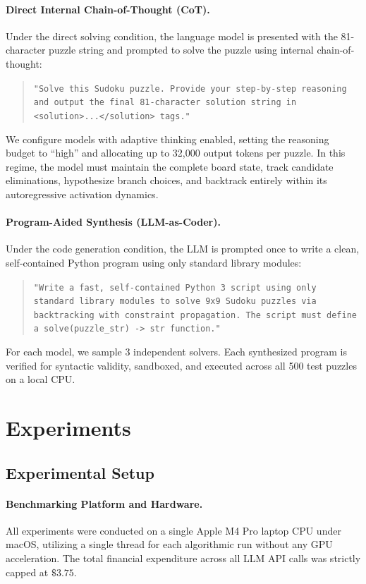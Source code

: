 \documentclass{article} %
\begin{document}
\paragraph{Direct Internal Chain-of-Thought (CoT).}
Under the direct solving condition, the language model is presented with the 81-character puzzle string and prompted to solve the puzzle using internal chain-of-thought:
\begin{quote}
\small
\texttt{"Solve this Sudoku puzzle. Provide your step-by-step reasoning and output the final 81-character solution string in <solution>...</solution> tags."}
\end{quote}
We configure models with adaptive thinking enabled, setting the reasoning budget to ``high'' and allocating up to 32,000 output tokens per puzzle. In this regime, the model must maintain the complete board state, track candidate eliminations, hypothesize branch choices, and backtrack entirely within its autoregressive activation dynamics.

\paragraph{Program-Aided Synthesis (LLM-as-Coder).}
Under the code generation condition, the LLM is prompted once to write a clean, self-contained Python program using only standard library modules:
\begin{quote}
\small
\texttt{"Write a fast, self-contained Python 3 script using only standard library modules to solve 9x9 Sudoku puzzles via backtracking with constraint propagation. The script must define a solve(puzzle\_str) -> str function."}
\end{quote}
For each model, we sample 3 independent solvers. Each synthesized program is verified for syntactic validity, sandboxed, and executed across all 500 test puzzles on a local CPU.

\section{Experiments}
\label{sec:experiments}

\subsection{Experimental Setup}
\paragraph{Benchmarking Platform and Hardware.} All experiments were conducted on a single Apple M4 Pro laptop CPU under macOS, utilizing a single thread for each algorithmic run without any GPU acceleration. The total financial expenditure across all LLM API calls was strictly capped at $\$3.75$.
\end{document}
